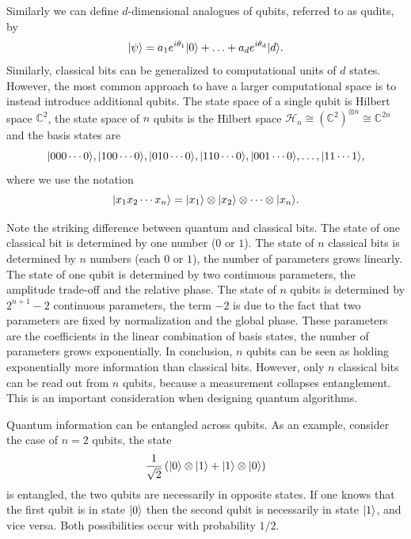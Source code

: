 \documentclass[a4paper,10pt,oneside]{book}
\theoremstyle{plain}
\theoremstyle{definition}
\theoremstyle{remark}
\DeclarePairedDelimiter\ket{\lvert}{\rangle}
\begin{document}
Similarly we can define $d$-dimensional analogues of qubits, referred to as qudits, by
\begin{equation}
  \ket{\psi} = a_1 e^{i\theta_1} \ket{0} + \ldots + a_d e^{i \theta_d} \ket{d}.
\end{equation}
Similarly, classical bits can be generalized to computational units of $d$ states. However, the most common approach to have a larger computational space is to instead introduce additional qubits. The state space of a single qubit is Hilbert space $\mathbb{C}^2$, the state space of $n$ qubits is the Hilbert space $\mathcal{H}_n \cong (\mathbb{C}^2)^{\otimes n} \cong \mathbb{C}^{2n}$ and the basis states are
\begin{equation}
  \ket{000\cdots0},
  \ket{100\cdots0},
  \ket{010\cdots0},
  \ket{110\cdots0},
  \ket{001\cdots0},
  \ldots,
  \ket{11\cdots1},
\end{equation}
where we use the notation
\begin{equation}
  \ket{x_1x_2\cdots x_n} = \ket{x_1}\otimes\ket{x_2}\otimes\cdots\otimes\ket{x_n}.
\end{equation}

Note the striking difference between quantum and classical bits. The state of one classical bit is determined by one number ($0$ or $1$). The state of $n$ classical bits is determined by $n$ numbers (each $0$ or $1$), the number of parameters grows linearly. The state of one qubit is determined by two continuous parameters, the amplitude trade-off and the relative phase. The state of $n$ qubits is determined by $2^{n+1}-2$ continuous parameters, the term $-2$ is due to the fact that two parameters are fixed by normalization and the global phase. These parameters are the coefficients in the linear combination of basis states, the number of parameters grows exponentially. In conclusion, $n$ qubits can be seen as holding exponentially more information than classical bits. However, only $n$ classical bits can be read out from $n$ qubits, because a measurement collapses entanglement. This is an important consideration when designing quantum algorithms.

Quantum information can be entangled across qubits. As an example, consider the case of $n = 2$ qubits, the state
\begin{equation}
  \frac{1}{\sqrt{2}}\left(\ket{0}\otimes\ket{1} + \ket{1}\otimes\ket{0}\right)
\end{equation}
is entangled, the two qubits are necessarily in opposite states. If one knows that the first qubit is in state $\ket{0}$ then the second qubit is necessarily in state $\ket{1}$, and vice versa. Both possibilities occur with probability $1/2$.
\end{document}
